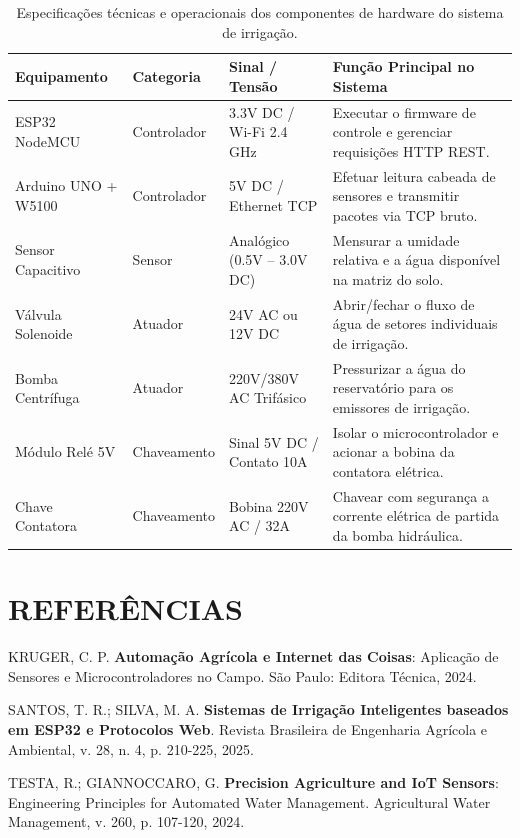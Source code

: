 \begin{table}[h!]
\centering
\fontsize{9}{11}\selectfont
\caption{Especificações técnicas e operacionais dos componentes de hardware do sistema de irrigação.}
\begin{tabular}{|p{3cm}|p{2.5cm}|p{3.5cm}|p{4cm}|}
\hline
\textbf{Equipamento} & \textbf{Categoria} & \textbf{Sinal / Tensão} & \textbf{Função Principal no Sistema} \\ \hline
ESP32 NodeMCU & Controlador & 3.3V DC / Wi-Fi 2.4 GHz & Executar o firmware de controle e gerenciar requisições HTTP REST. \\ \hline
Arduino UNO + W5100 & Controlador & 5V DC / Ethernet TCP & Efetuar leitura cabeada de sensores e transmitir pacotes via TCP bruto. \\ \hline
Sensor Capacitivo & Sensor & Analógico (0.5V -- 3.0V DC) & Mensurar a umidade relativa e a água disponível na matriz do solo. \\ \hline
Válvula Solenoide & Atuador & 24V AC ou 12V DC & Abrir/fechar o fluxo de água de setores individuais de irrigação. \\ \hline
Bomba Centrífuga & Atuador & 220V/380V AC Trifásico & Pressurizar a água do reservatório para os emissores de irrigação. \\ \hline
Módulo Relé 5V & Chaveamento & Sinal 5V DC / Contato 10A & Isolar o microcontrolador e acionar a bobina da contatora elétrica. \\ \hline
Chave Contatora & Chaveamento & Bobina 220V AC / 32A & Chavear com segurança a corrente elétrica de partida da bomba hidráulica. \\ \hline
\end{tabular}
\end{table}

\vspace{1.5em}

\section*{REFERÊNCIAS}

\begin{singlespace}
\noindent KRUGER, C. P. \textbf{Automação Agrícola e Internet das Coisas}: Aplicação de Sensores e Microcontroladores no Campo. São Paulo: Editora Técnica, 2024.

\vspace{0.8em}
\noindent SANTOS, T. R.; SILVA, M. A. \textbf{Sistemas de Irrigação Inteligentes baseados em ESP32 e Protocolos Web}. Revista Brasileira de Engenharia Agrícola e Ambiental, v. 28, n. 4, p. 210-225, 2025.

\vspace{0.8em}
\noindent TESTA, R.; GIANNOCCARO, G. \textbf{Precision Agriculture and IoT Sensors}: Engineering Principles for Automated Water Management. Agricultural Water Management, v. 260, p. 107-120, 2024.
\end{singlespace}
